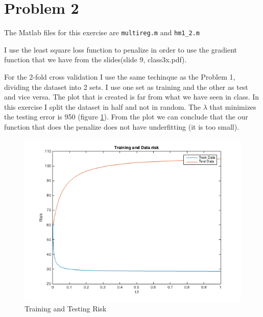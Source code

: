 \section{Problem 2}

The Matlab files for this exercise are \texttt{multireg.m} and \texttt{hm1\_2.m}

I use the least square loss function to penalize in order to use the gradient function that we have from the slides(slide 9, class3x.pdf).

For the 2-fold cross validation I use the same techinque as the Problem 1, dividing the dataset into 2 sets. I use one set as training and the other as test and vice versa. The plot that is created is far from what we have seen in class. In this exercise I split the dataset in half and not in random. The $\lambda$ that minimizes the testing error is 950 (figure \ref{fig:ex2}).
From the plot we can conclude that the our function that does the penalize does not have underfitting (it is too small).

\begin{figure}[!h]
{
    \includegraphics[width=\columnwidth]
    {figures/hm1_2.png}
    \caption{\footnotesize{\bf}Training and Testing Risk}
    \label{fig:ex2}
}
\end{figure} 
